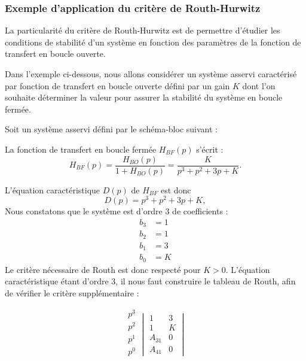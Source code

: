 \subsubsection{Exemple d'application du critère de Routh-Hurwitz}

La particularité du critère de Routh-Hurwitz est de permettre d'étudier les conditions
de stabilité d'un système en fonction des paramètres de la fonction de 
transfert en boucle ouverte.

Dans l'exemple ci-dessous, nous allons considérer un système asservi caractérisé 
par fonction de transfert en boucle ouverte défini par un gain $K$
dont l'on souhaite déterminer la valeur pour assurer la stabilité du système en boucle fermée.

Soit un système asservi défini par le schéma-bloc suivant :
\begin{center}
\end{center}

La fonction de transfert en boucle fermée $H_{BF}(p)$ s'écrit :
$$
H_{BF}(p)=\dfrac{H_{BO}(p)}{1+H_{BO}(p)}=\dfrac{K}{p^3+p^2+3p+K}.
$$

L'équation caractéristique $D(p)$ de $H_{BF}$ est donc 
$$
D(p)=p^3+p^2+3p+K,
$$
Nous constatons que le système est d'ordre 3 de coefficients :
\begin{align*}
    b_3&=1\\
    b_2&=1\\
    b_1&=3\\
    b_0&=K
\end{align*}
Le critère nécessaire de Routh est donc respecté pour $K>0$. L'équation caractéristique 
étant d'ordre 3, il nous faut construire le tableau de Routh, afin de vérifier le critère supplémentaire :

\[
\begin{matrix}
    p^3 \\
    p^2 \\
    \hline
    p^1 \\
    p^0 \\
\end{matrix}
\begin{vmatrix}
     1      & 3  \\
     1      & K  \\
    \hline
    A_{31}  & 0  \\
    A_{41}  & 0    
    \end{vmatrix}
\]

